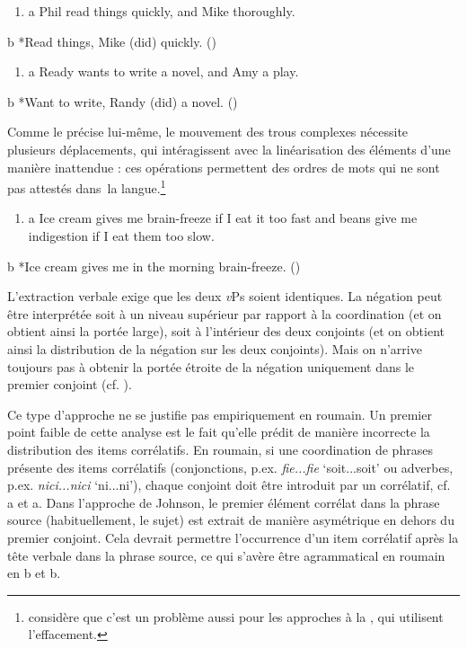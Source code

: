 \begin{enumerate}
\item a   Phil read things quickly, and Mike thoroughly.  


\end{enumerate}
  b  *Read things, Mike (did) quickly.     (\citet[510]{Vicente2010})


\begin{enumerate}
\item a   Ready wants to write a novel, and Amy a play.  


\end{enumerate}
  b  *Want to write, Randy (did) a novel.     (\citet[510]{Vicente2010})

Comme \citet{Johnson2009} le précise lui-même, le mouvement des trous complexes nécessite plusieurs déplacements, qui intéragissent avec la linéarisation des éléments d'une manière inattendue : ces opérations permettent des ordres de mots qui ne sont pas attestés dans~la langue.\footnote{\citet{Johnson2009} considère que c'est un problème aussi pour les approches à la \citet{Coppock2001}, qui utilisent l'effacement.}


\begin{enumerate}
\item a   Ice cream gives me brain-freeze if I eat it too fast and beans give me indigestion if I eat them too slow.  


\end{enumerate}
  b  *Ice cream gives me in the morning brain-freeze.  (\citet[314]{Johnson2009})

L'extraction verbale exige que les deux \textit{v}Ps soient identiques. La négation peut être interprétée soit à un niveau supérieur par rapport à la coordination (et on obtient ainsi la portée large), soit à l'intérieur des deux conjoints (et on obtient ainsi la distribution de la négation sur les deux conjoints). Mais on n'arrive toujours pas à obtenir la portée étroite de la négation uniquement dans le premier conjoint (cf. \citet{Repp2009}). 

Ce type d'approche ne se justifie pas empiriquement en roumain. Un premier point faible de cette analyse est le fait qu'elle prédit de manière incorrecte la distribution des items corrélatifs. En roumain, si une coordination de phrases présente des items corrélatifs (conjonctions, p.ex. \textit{fie...fie} `soit...soit' ou adverbes, p.ex. \textit{nici...nici} `ni...ni'), chaque conjoint doit être introduit par un corrélatif, cf. a et a. Dans l'approche de Johnson, le premier élément corrélat dans la phrase source (habituellement, le sujet) est extrait de manière asymétrique en dehors du premier conjoint. Cela devrait permettre l'occurrence d'un item corrélatif après la tête verbale dans la phrase source, ce qui s'avère être agrammatical en roumain en b et b.  


